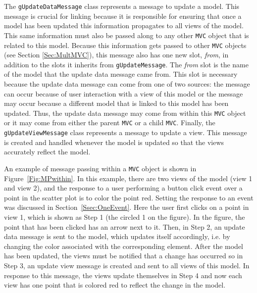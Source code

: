 \documentclass{article}[11pt]
\newcommand{\Robject}[1]{{\texttt{#1}}}
\newcommand{\Rslot}[1]{\textsl{#1}}
\newcommand{\Rclass}[1]{\texttt{#1}}
\begin{document}
The \Rclass{gUpdateDataMessage} class represents a message to update
a model.  This message is crucial for linking because it is
responsible for ensuring that once a model has been updated this
information propagates to all views of the model.  This
same information must also be passed along to any other \Robject{MVC} object
that is related to this model.  Because this
information gets passed to other \Robject{MVC} objects (see Section
\ref{Sec:MultMVC}), this message also has one new slot, \Rslot{from}, in
addition to the slots it inherits from \Rclass{gUpdateMessage}.  The
\Rslot{from} slot is the name of the model that the update data
message came from.  This slot is necessary because the update data message can
come from one of two sources: the message can occur because of user
interaction with a view of this model or the message may
occur because a different model that is
linked to this model has been updated.  Thus, the update data
message may come from within this \Robject{MVC} object or it may come from
either the parent \Robject{MVC} or a child \Robject{MVC}.  Finally, the
\Rclass{gUpdateViewMessage} class represents a message to update a
view.  This message is created and handled whenever the
model is updated so that the views accurately reflect the model. 

An example of message passing within a \Robject{MVC} object is shown
in Figure~\ref{Fig:MPwithin}.  In this example, there are two views of the
model (view 1 and view 2), and the response to a user
performing a button click event over a point in the scatter plot is to
color the point red.  Setting the response to an event was discussed
in Section~\ref{Ssec:OneEvent}.  Here the user first clicks on a point
in view 1, which is shown as Step 1 (the circled 1 on the
figure).  In the figure, the point that has been clicked has an arrow
next to it.  Then, in Step 2, an update data message is sent to the
model, which updates itself accordingly, i.e. by changing the color
associated with the corresponding element.  After the model has been
updated, the views must be notified that a change has occurred so in
Step 3, an update view message is created and sent to all views of
this model.  In response to this message, the views update themselves in
Step 4 and now each view has one point that is colored red to reflect the
change in the model.
\end{document}
